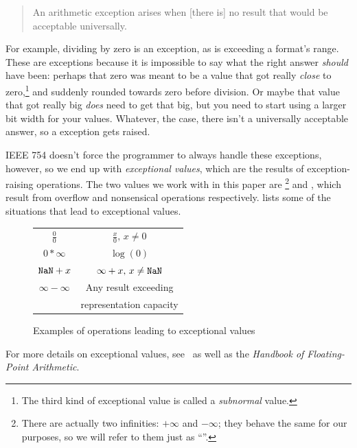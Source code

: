 \documentclass{juliacon}
\begin{document}
\begin{quote}
An arithmetic exception arises when [there is] no result that would be acceptable universally.
\end{quote}

For example, dividing by zero is an exception, as is exceeding a \fp{} format's range.
These are exceptions because it is impossible to say what the right answer \emph{should} have been: perhaps that zero was meant to be a value that got really \emph{close} to zero,\footnote{The third kind of exceptional value is called a \emph{subnormal} value.} and suddenly rounded towards zero before division.
Or maybe that value that got really big \emph{does} need to get that big, but you need to start using a larger bit width for your \fp{} values.
Whatever, the case, there isn't a universally acceptable answer, so a \fp{} exception gets raised.

IEEE 754 doesn't force the programmer to always handle these exceptions, however, so we end up with \emph{exceptional values}, which are the results of exception-raising operations.
The two values we work with in this paper are \Inf{}\footnote{There are actually two infinities: $+\infty$ and $-\infty$; they behave the same for our purposes, so we will refer to them just as ``\Inf{}''.} and \NaN{}, which result from overflow and nonsensical operations respectively.
 lists some of the situations that lead to exceptional values.

\begin{figure}[ht]
  \centering
  \label{fig:nan-gens}
  \begin{tabular}{c | c}
    \NaN{} & \Inf{} \\
    \hline
    $\tfrac{0}{0}$ & $\tfrac{x}{0},\, x \neq 0$ \\
    $0 * \infty$ & $\log{(0)}$ \\
    $\text{\texttt{NaN}} + x$ & $\infty + x,\, x \neq \text{\texttt{NaN}}$ \\
    $\infty - \infty$ & Any result exceeding \\
    & representation capacity
  \end{tabular}
  \caption{Examples of operations leading to exceptional values}
\end{figure}

For more details on exceptional values, see~\cite{knuthArtComputerProgramming1997,torontoPracticallyAccurateFloatingPoint2014} as well as the \textit{Handbook of Floating-Point Arithmetic}.~\cite{mullerHandbookFloatingPointArithmetic2018}
\end{document}
